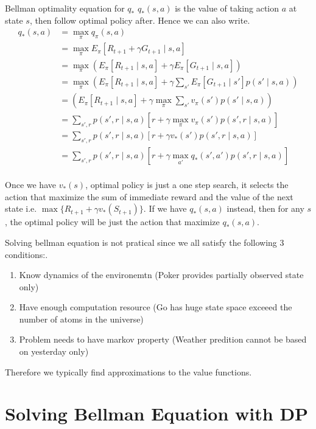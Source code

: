\documentclass[twocolumn, 10pt]{article}
\begin{document}
	Bellman optimality equation for $q_*$
	$q_*(s,a)$ is the value of taking action $a$ at state $s$, then follow optimal policy after. Hence we can also write.
	$$ 
	\begin{aligned}
	q_*(s, a) &= \max_{\pi} q_{\pi} (s, a) \\
	&= \max_{\pi} E_{\pi} [R_{t+1} + \gamma G_{t+1} \mid s, a] \\
	& = \max_{\pi} \left( E_{\pi}[R_{t+1} \mid s, a]  + \gamma E_{\pi}[ G_{t+1}  \mid s, a]  \right)\\
	&= \max_{\pi}  \left( E_{\pi}[R_{t+1} \mid s, a]  +  \gamma \sum_{s'} E_{\pi}[ G_{t+1} \mid s'] p(s' \mid s, a)  \right)\\
	&=\left( E_{\pi}[R_{t+1} \mid s, a]  +  \gamma  \max_{\pi}   \sum_{s'} v_{\pi}(s') p(s' \mid s, a)  \right)\\
	&= \sum_{s', r }  p(s', r \mid s, a) \left[ r +  \gamma  \max_{\pi}  v_{\pi}(s') p(s', r \mid s, a) \right] \\
	&= \sum_{s', r }  p(s', r \mid s, a) \left[ r +  \gamma  v_{*}(s') p(s', r \mid s, a) \right] \\
	&= \sum_{s', r }  p(s', r \mid s, a) \left[ r +  \gamma  \max_{a'} q_{*}(s', a') p(s', r \mid s, a) \right] \\
	\end{aligned}$$
	
	Once we have $v_*(s)$, optimal policy is just a one step search, it selects the action that maximize the sum of immediate reward and the value of the next state i.e.  $\max\{R_{t+1} + \gamma v_*(S_{t+1})\}$.  If we have $q_*(s, a)$ instead, then for any $s$,  the optimal policy will be just the action that maximize $q_*(s, a)$.
	
	Solving bellman equation is not pratical since we all satisfy the following 3 conditions:.
	\begin{enumerate}
		\item Know dynamics of the environemtn (Poker provides partially observed state only)
		\item  Have  enough computation resource (Go has huge state space exceeed the number of atoms in the universe)
		\item  Problem needs to have markov property (Weather predition cannot be based on yesterday only)
	\end{enumerate}
	Therefore we typically find approximations to the value functions.
	
	\section*{Solving Bellman Equation with DP}
	
\end{document}
